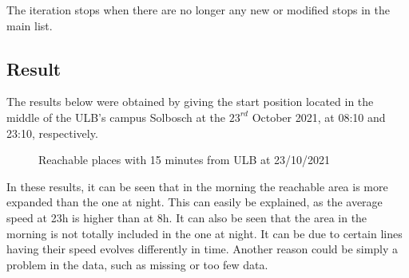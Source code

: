 \documentclass{article}
\begin{document}
The iteration stops when there are no longer any new or modified stops in the main list.



\subsection{Result}

The results below were obtained by giving the start position located in the middle of the ULB's campus Solbosch at the $23^{rd}$ October 2021, at 08:10 and 23:10, respectively.


\begin{figure}[H]%
    \centering
    \qquad
    \caption{Reachable places with 15 minutes from ULB at 23/10/2021}%
\end{figure}

In these results, it can be seen that in the morning the reachable area is more expanded than the one at night. This can easily be explained, as the average speed at 23h is higher than at 8h. It can also be seen that the area in the morning is not totally included in the one at night. It can be due to certain lines having their speed evolves differently in time. Another reason could be simply a problem in the data, such as missing or too few data.
\end{document}
